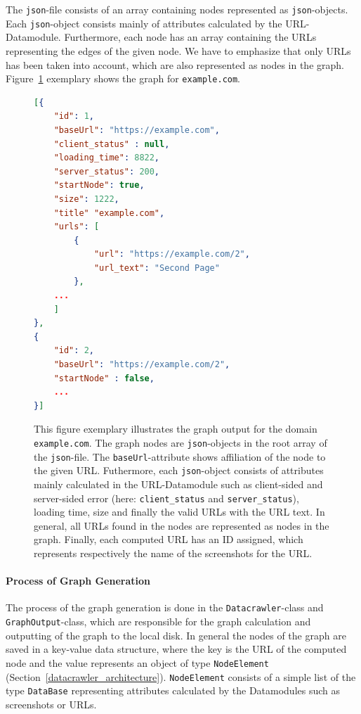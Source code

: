 The \texttt{json}-file consists of an array containing nodes represented as \texttt{json}-objects. Each \texttt{json}-object consists mainly of attributes calculated by the URL-Datamodule. Furthermore, each node has an array containing the URLs representing the edges of the given node. We have to emphasize that only URLs has been taken into account, which are also represented as nodes in the graph. Figure~\ref{examplecom_graph} exemplary shows the graph for \texttt{example.com}.
\begin{figure}
	\centering
	\begin{lstlisting}[language=json,firstnumber=1]
[{
	"id": 1,
	"baseUrl": "https://example.com",
	"client_status" : null,
	"loading_time": 8822,
	"server_status": 200,
	"startNode": true,
	"size": 1222,
	"title" "example.com",
	"urls": [
		{
			"url": "https://example.com/2",
			"url_text": "Second Page"
		},
	...
	]
},
{
	"id": 2,
	"baseUrl": "https://example.com/2",
	"startNode" : false,
	...
}]
	\end{lstlisting}
	\caption[Example Graph generated by the Datacrawler]{This figure exemplary illustrates the graph output for the domain \texttt{example.com}. The graph nodes are \texttt{json}-objects in the root array of the \texttt{json}-file. The \texttt{baseUrl}-attribute shows affiliation of the node to the given URL. Futhermore, each \texttt{json}-object consists of attributes mainly calculated in the URL-Datamodule such as client-sided and server-sided error (here: \texttt{client\_status} and \texttt{server\_status}), loading time, size and finally the valid URLs with the URL text. In general, all URLs found in the nodes are represented as nodes in the graph. Finally, each computed URL has an ID assigned, which represents respectively the name of the screenshots for the URL.}
	\label{examplecom_graph}
\end{figure}

\paragraph*{Process of Graph Generation} 
The process of the graph generation is done in the \texttt{Datacrawler}-class and \texttt{GraphOutput}-class, which are responsible for the graph calculation and outputting of the graph to the local disk. In general the nodes of the graph are saved in a key-value data structure, where the key is the URL of the computed node and the value represents an object of type \texttt{NodeElement} (Section~\ref{datacrawler_architecture}). \texttt{NodeElement} consists of a simple list of the type \texttt{DataBase} representing attributes calculated by the Datamodules such as screenshots or URLs.

